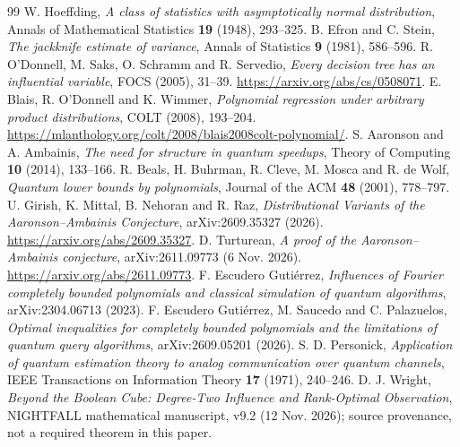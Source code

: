 \documentclass[11pt,letterpaper]{article}
\theoremstyle{definition}
\begin{document}
\begin{thebibliography}{99}\setlength{\itemsep}{4pt}
 W. Hoeffding,
\emph{A class of statistics with asymptotically normal distribution},
Annals of Mathematical Statistics \textbf{19} (1948), 293--325.
 B. Efron and C. Stein,
\emph{The jackknife estimate of variance},
Annals of Statistics \textbf{9} (1981), 586--596.
 R. O'Donnell, M. Saks, O. Schramm and R. Servedio,
\emph{Every decision tree has an influential variable},
FOCS (2005), 31--39.
\url{https://arxiv.org/abs/cs/0508071}.
 E. Blais, R. O'Donnell and K. Wimmer,
\emph{Polynomial regression under arbitrary product distributions},
COLT (2008), 193--204.
\url{https://mlanthology.org/colt/2008/blais2008colt-polynomial/}.
 S. Aaronson and A. Ambainis,
\emph{The need for structure in quantum speedups},
Theory of Computing \textbf{10} (2014), 133--166.
 R. Beals, H. Buhrman, R. Cleve, M. Mosca and R. de Wolf,
\emph{Quantum lower bounds by polynomials}, Journal of the ACM
\textbf{48} (2001), 778--797.
 U. Girish, K. Mittal, B. Nehoran and R. Raz,
\emph{Distributional Variants of the Aaronson--Ambainis Conjecture},
arXiv:2609.35327 (2026).
\url{https://arxiv.org/abs/2609.35327}.
 D. Turturean,
\emph{A proof of the Aaronson--Ambainis conjecture},
arXiv:2611.09773 (6 Nov. 2026).
\url{https://arxiv.org/abs/2611.09773}.
 F. Escudero Guti\'errez,
\emph{Influences of Fourier completely bounded polynomials and classical simulation of quantum algorithms},
arXiv:2304.06713 (2023).
 F. Escudero Guti\'errez, M. Saucedo and C. Palazuelos,
\emph{Optimal inequalities for completely bounded polynomials and the limitations of quantum query algorithms},
arXiv:2609.05201 (2026).
 S. D. Personick,
\emph{Application of quantum estimation theory to analog communication over quantum channels},
IEEE Transactions on Information Theory \textbf{17} (1971), 240--246.
 D. J. Wright,
\emph{Beyond the Boolean Cube: Degree-Two Influence and Rank-Optimal Observation},
NIGHTFALL mathematical manuscript, v9.2 (12 Nov. 2026); source provenance,
not a required theorem in this paper.
\end{thebibliography}
\end{document}
